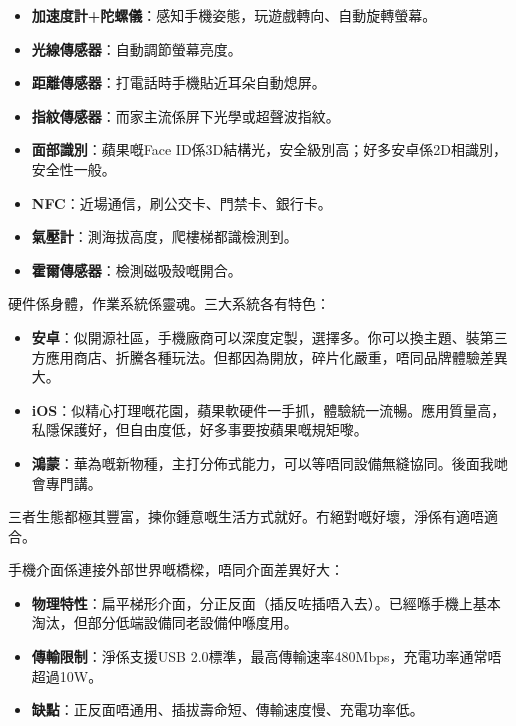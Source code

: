 \begin{itemize}
  \item \textbf{加速度計+陀螺儀}：感知手機姿態，玩遊戲轉向、自動旋轉螢幕。
  \item \textbf{光線傳感器}：自動調節螢幕亮度。
  \item \textbf{距離傳感器}：打電話時手機貼近耳朵自動熄屏。
  \item \textbf{指紋傳感器}：而家主流係屏下光學或超聲波指紋。
  \item \textbf{面部識別}：蘋果嘅Face ID係3D結構光，安全級別高；好多安卓係2D相識別，安全性一般。
  \item \textbf{NFC}：近場通信，刷公交卡、門禁卡、銀行卡。
  \item \textbf{氣壓計}：測海拔高度，爬樓梯都識檢測到。
  \item \textbf{霍爾傳感器}：檢測磁吸殼嘅開合。
\end{itemize}


硬件係身體，作業系統係靈魂。三大系統各有特色：

\begin{itemize}
  \item \textbf{安卓}：似開源社區，手機廠商可以深度定製，選擇多。你可以換主題、裝第三方應用商店、折騰各種玩法。但都因為開放，碎片化嚴重，唔同品牌體驗差異大。
  \item \textbf{iOS}：似精心打理嘅花園，蘋果軟硬件一手抓，體驗統一流暢。應用質量高，私隱保護好，但自由度低，好多事要按蘋果嘅規矩嚟。
  \item \textbf{鴻蒙}：華為嘅新物種，主打分佈式能力，可以等唔同設備無縫協同。後面我哋會專門講。
\end{itemize}

三者生態都極其豐富，揀你鍾意嘅生活方式就好。冇絕對嘅好壞，淨係有適唔適合。


手機介面係連接外部世界嘅橋樑，唔同介面差異好大：


\begin{itemize}
  \item \textbf{物理特性}：扁平梯形介面，分正反面（插反咗插唔入去）。已經喺手機上基本淘汰，但部分低端設備同老設備仲喺度用。
  \item \textbf{傳輸限制}：淨係支援USB 2.0標準，最高傳輸速率480Mbps，充電功率通常唔超過10W。
  \item \textbf{缺點}：正反面唔通用、插拔壽命短、傳輸速度慢、充電功率低。
\end{itemize}

